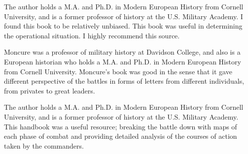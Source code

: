 The author holds a M.A. and Ph.D. in Modern European History
from Cornell University, and is a former professor of history at the U.S.
Military Academy.  I found this book to be relatively unbiased.  This book was
useful in determining the operational situation.  I highly recommend this
source.   

Moncure was a professor of military history at Davidson College, and also is a
European historian who holds a M.A. and Ph.D. in Modern European History from
Cornell University. Moncure’s book was good in the sense that it gave different
perspective of the battles in forms of  letters from different individuals,
from privates to great leaders.

The author holds a M.A. and Ph.D. in Modern European History from Cornell
University, and is a former professor of history at the U.S. Military Academy.
This handbook was a useful resource; breaking the battle down with maps of each
phase of combat and providing detailed analysis of the courses of action taken
by the commanders.
